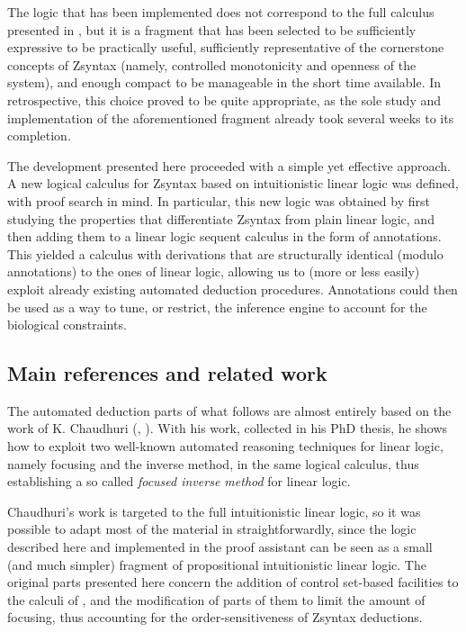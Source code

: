 The logic that has been implemented does not correspond to the full calculus
presented in \cite{adding-logic}, but it is a fragment that has been selected to
be sufficiently expressive to be practically useful, sufficiently representative
of the cornerstone concepts of Zsyntax (namely, controlled monotonicity and
openness of the system), and enough compact to be manageable in the short time
available. In retrospective, this choice proved to be quite appropriate, as the
sole study and implementation of the aforementioned fragment already took
several weeks to its completion.

The development presented here proceeded with a simple yet effective approach. A
new logical calculus for Zsyntax based on intuitionistic linear logic was
defined, with proof search in mind. In particular, this new logic was obtained
by first studying the properties that differentiate Zsyntax from plain linear
logic, and then adding them to a linear logic sequent calculus in the form of
annotations.  This yielded a calculus with derivations that are structurally
identical (modulo annotations) to the ones of linear logic, allowing us to (more
or less easily) exploit already existing automated deduction
procedures. Annotations could then be used as a way to tune, or restrict, the
inference engine to account for the biological constraints.

\subsection{Main references and related work}

The automated deduction parts of what follows are almost entirely based on the
work of K. Chaudhuri (\cite{chaudhuri-paper}, \cite{chaudhuri-thesis}). With his
work, collected in his PhD thesis, he shows how to exploit two well-known
automated reasoning techniques for linear logic, namely focusing and the inverse
method, in the same logical calculus, thus establishing a so called
\emph{focused inverse method} for linear logic.

Chaudhuri's work is targeted to the full intuitionistic linear logic, so it was
possible to adapt most of the material in \cite{chaudhuri-thesis}
straightforwardly, since the logic described here and implemented in the proof
assistant can be seen as a small (and much simpler) fragment of propositional
intuitionistic linear logic. The original parts presented here concern the
addition of control set-based facilities to the calculi of
\cite{chaudhuri-thesis}, and the modification of parts of them to limit the
amount of focusing, thus accounting for the order-sensitiveness of Zsyntax
deductions.

